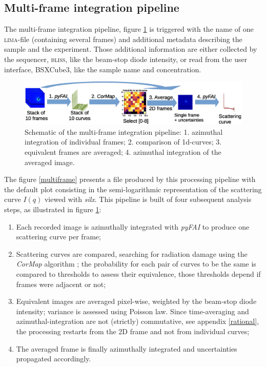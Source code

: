 \documentclass[preprint]{iucr}              %
\begin{document}
\subsection{Multi-frame integration pipeline}
\label{multiframe_pipeline}
The multi-frame integration pipeline, figure \ref{multiframe_worflow} is triggered with the name of one \textsc{lima}-file (containing several frames) and additional metadata describing the sample and the experiment.
Those additional information are either collected by the sequencer, \textsc{bliss}, like the beam-stop diode intensity, or read from the user interface, BSXCube3, like the sample name and concentration.

\begin{figure}
     \label{multiframe_worflow}
     \begin{center} 
     \caption{Schematic of the multi-frame integration pipeline: 
     1. azimuthal integration of individual frames; 
     2. comparison of 1d-curves;
     3. equivalent frames are averaged;
     4. azimuthal integration of the averaged image.}
     \includegraphics[width=12cm]{multiframe_pipeline.eps}
     \end{center}
\end{figure}

The figure \ref{multiframe} presents a file produced by this processing pipeline with the default plot consisting in the semi-logarithmic representation of the scattering curve $I(q)$ viewed with \textit{silx}.
This pipeline is built of four subsequent analysis steps, as illustrated in figure \ref{multiframe_worflow}:
\begin{enumerate}
\item Each recorded image is azimuthally integrated with \textit{pyFAI} \cite{pyfai_2020} to produce one scattering curve per frame;
\item Scattering curves are compared, searching for radiation damage using the \textit{CorMap} algorithm \cite{CorMap}; the probability for each pair of curves to be the same is compared to thresholds to assess their equivalence, those thresholds depend if frames were adjacent or not;
\item Equivalent images are averaged pixel-wise, weighted by the beam-stop diode intensity; variance is assessed using Poisson law. Since time-averaging and azimuthal-integration are not (strictly) commutative, see appendix \ref{rational}, the processing restarts from the 2D frame and not from individual curves;
\item The averaged frame is finally azimuthally integrated and uncertainties propagated accordingly. 
\end{enumerate}
\end{document}
